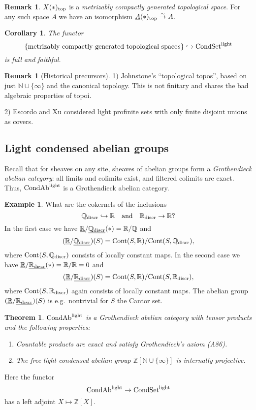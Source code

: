 \documentclass[12pt,a4paper]{amsart}
\newtheorem{thm}[PARA]{Theorem}
\newtheorem{cor}[PARA]{Corollary}
\theoremstyle{definition}
\newtheorem{remark}[PARA]{Remark}
\newtheorem{rem}[PARA]{Remark}
\theoremstyle{theorem}
\newtheorem{example}[PARA]{Example}
\newcommand{\N}{{\mathbb{N}}}
\newcommand{\Q}{{\mathbb{Q}}}
\newcommand{\R}{{\mathbb{R}}}
\newcommand{\Z}{{\mathbb{Z}}}
\newcommand{\ul}{\underline}
\newcommand{\into}{\hookrightarrow}
\newcommand{\Cont}{{\rm Cont}}
\newcommand{\disc}{{\rm discr}}
\begin{document}
\begin{remark}
$X(*)_{\rm top}$ is a {\em metrizably compactly generated topological
  space}. For any such space $A$ we have an isomorphism
  $\ul{A}(*)_{\rm top}\stackrel{\sim}\to A$. 
\end{remark}

\begin{cor}
The functor
$$
  \{\text{metrizably compactly generated topological space}s\} \into
  \text{CondSet}^{\rm light}
$$
is full and faithful. 
\end{cor}

\begin{rem}[Historical precursors]
1) Johnstone's ``topological topos'', based on just $\N\cup\{\infty\}$
and the canonical topology. This is not finitary and shares the bad
algebraic properties of topoi. 

2) Escordo and Xu considered light profinite sets with only finite
disjoint unions as covers. 
\end{rem}

\subsection{Light condensed abelian groups}

Recall that for sheaves on any site, sheaves of abelian groups form a
{\em Grothendieck abelian category}: all limits and colimits exist,
and filtered colimits are exact. 
Thus, $\text{CondAb}^{\rm light}$ is a Grothendieck abelian category. 

\begin{example}
What are the cokernels of the inclusions
$$
  \Q_\disc\into\R \quad\text{and}\quad \R_\disc\to \R?
$$
In the first case we have $\ul{\R}/\ul{\Q_\disc}(*)=\R/\Q$ and 
$$
  (\ul{\R}/\ul{\Q_\disc})(S) = \Cont(S,\R)/\Cont(S,\Q_\disc),
$$
where $\Cont(S,\Q_\disc)$ consists of locally constant maps.
In the second case we have $\ul{\R}/\ul{\R_\disc}(*)=\R/\R=0$ and 
$$
  (\ul{\R}/\ul{\R_\disc})(S) = \Cont(S,\R)/\Cont(S,\R_\disc),
$$
where $\Cont(S,\R_\disc)$ again consists of locally constant maps.
The abelian group $(\ul{\R}/\ul{\R_\disc})(S)$ is e.g.~nontrivial for
$S$ the Cantor set.
\end{example}

\begin{thm}
$\text{CondAb}^{\rm light}$ is a Grothendieck abelian category with
  tensor products and the following properties:
\begin{enumerate}
\item Countable products are exact and satisfy Grothendieck's axiom
  (A86).
\item The free light condensed abelian group $\Z[\N\cup\{\infty\}]$ is
  {\em internally projective}. 
\end{enumerate}
\end{thm}

Here the functor 
$$
  \text{CondAb}^{\rm light} \to \text{CondSet}^{\rm light}
$$
has a left adjoint $X\mapsto \Z[X]$. 
  


\end{document}
